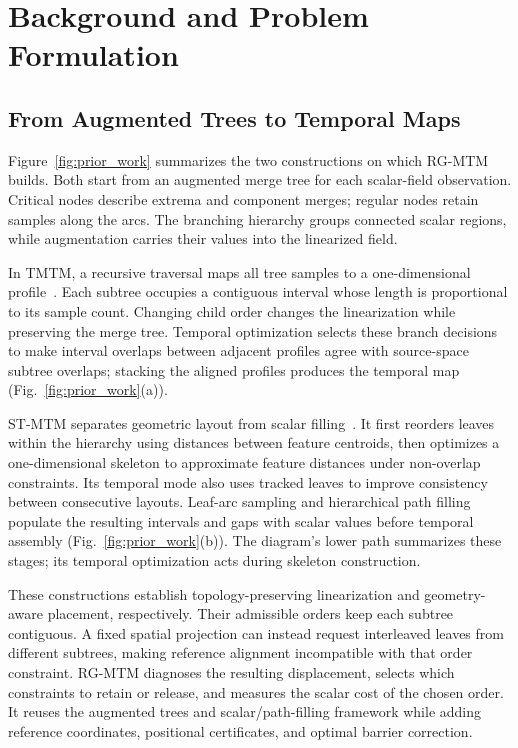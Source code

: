 \section{Background and Problem Formulation}\label{sec:model}
\subsection{From Augmented Trees to Temporal Maps}\label{sec:prior_pipelines}

Figure~\ref{fig:prior_work} summarizes the two constructions on which RG-MTM builds. Both start from an augmented merge tree for each scalar-field observation. Critical nodes describe extrema and component merges; regular nodes retain samples along the arcs. The branching hierarchy groups connected scalar regions, while augmentation carries their values into the linearized field.

In TMTM, a recursive traversal maps all tree samples to a one-dimensional profile~\cite{Koepp:2023:TMTM}. Each subtree occupies a contiguous interval whose length is proportional to its sample count. Changing child order changes the linearization while preserving the merge tree. Temporal optimization selects these branch decisions to make interval overlaps between adjacent profiles agree with source-space subtree overlaps; stacking the aligned profiles produces the temporal map (Fig.~\ref{fig:prior_work}(a)).

ST-MTM separates geometric layout from scalar filling~\cite{STMTM:2026}. It first reorders leaves within the hierarchy using distances between feature centroids, then optimizes a one-dimensional skeleton to approximate feature distances under non-overlap constraints. Its temporal mode also uses tracked leaves to improve consistency between consecutive layouts. Leaf-arc sampling and hierarchical path filling populate the resulting intervals and gaps with scalar values before temporal assembly (Fig.~\ref{fig:prior_work}(b)). The diagram's lower path summarizes these stages; its temporal optimization acts during skeleton construction.

These constructions establish topology-preserving linearization and geometry-aware placement, respectively. Their admissible orders keep each subtree contiguous. A fixed spatial projection can instead request interleaved leaves from different subtrees, making reference alignment incompatible with that order constraint. RG-MTM diagnoses the resulting displacement, selects which constraints to retain or release, and measures the scalar cost of the chosen order. It reuses the augmented trees and scalar/path-filling framework while adding reference coordinates, positional certificates, and optimal barrier correction.

